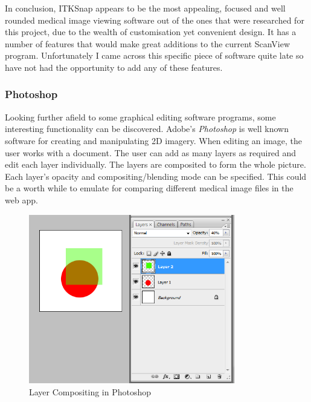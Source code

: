 \documentclass[a4paper,11pt,twoside]{article}
\begin{document}
In conclusion, ITKSnap appears to be the most appealing, focused and well rounded medical image viewing software out of the ones that were researched for this project, due to the wealth of customisation yet convenient design. It has a number of features that would make great additions to the current ScanView program. Unfortunately I came across this specific piece of software quite late so have not had the opportunity to add any of these features. 



\subsubsection{Photoshop}
Looking further afield to some graphical editing software programs, some interesting functionality can be discovered. Adobe's \textit{Photoshop} is well known software for creating and manipulating 2D imagery. When editing an image, the user works with a document. The user can add as many layers as required and edit each layer individually. The layers are composited to form the whole picture. Each layer's opacity and compositing/blending mode can be specified. This could be a worth while to emulate for comparing different medical image files in the web app.


\begin{figure}[ht!]
\centering
\includegraphics[width=90mm]{..//literatureSurvey/graphics/photoshop_01.png}
\caption{Layer Compositing in Photoshop}
\label{fig:UIdesign1}
\end{figure}
\end{document}
